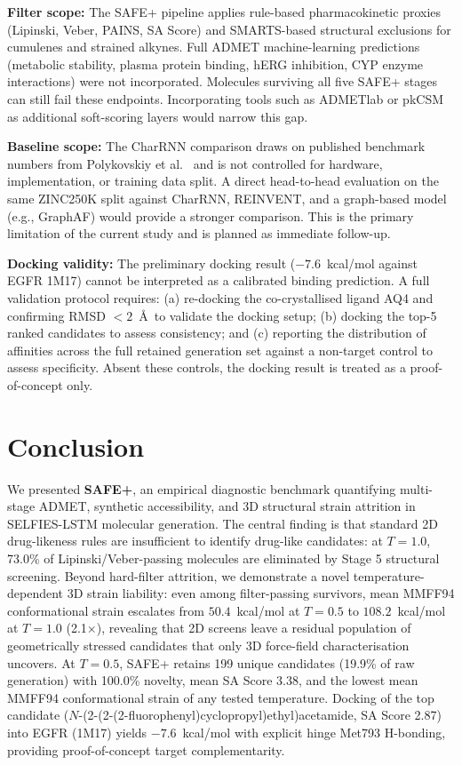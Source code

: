 \documentclass[conference]{IEEEtran}
\begin{document}
\textbf{Filter scope:} The SAFE+ pipeline applies rule-based pharmacokinetic proxies (Lipinski, Veber, PAINS, SA Score) and SMARTS-based structural exclusions for cumulenes and strained alkynes. Full ADMET machine-learning predictions (metabolic stability, plasma protein binding, hERG inhibition, CYP enzyme interactions) were not incorporated. Molecules surviving all five SAFE+ stages can still fail these endpoints. Incorporating tools such as ADMETlab or pkCSM as additional soft-scoring layers would narrow this gap.

\textbf{Baseline scope:} The CharRNN comparison draws on published benchmark numbers from Polykovskiy et al.\ \cite{ref11} and is not controlled for hardware, implementation, or training data split. A direct head-to-head evaluation on the same ZINC250K split against CharRNN, REINVENT, and a graph-based model (e.g., GraphAF) would provide a stronger comparison. This is the primary limitation of the current study and is planned as immediate follow-up.

\textbf{Docking validity:} The preliminary docking result ($-7.6$~kcal/mol against EGFR 1M17) cannot be interpreted as a calibrated binding prediction. A full validation protocol requires: (a) re-docking the co-crystallised ligand AQ4 and confirming RMSD $< 2$~\AA\ to validate the docking setup; (b) docking the top-5 ranked candidates to assess consistency; and (c) reporting the distribution of affinities across the full retained generation set against a non-target control to assess specificity. Absent these controls, the docking result is treated as a proof-of-concept only.


\section{Conclusion}

We presented \textbf{SAFE+}, an empirical diagnostic benchmark quantifying multi-stage ADMET, synthetic accessibility, and 3D structural strain attrition in SELFIES-LSTM molecular generation. The central finding is that standard 2D drug-likeness rules are insufficient to identify drug-like candidates: at $T{=}1.0$, 73.0\% of Lipinski/Veber-passing molecules are eliminated by Stage 5 structural screening. Beyond hard-filter attrition, we demonstrate a novel temperature-dependent 3D strain liability: even among filter-passing survivors, mean MMFF94 conformational strain escalates from $50.4$~kcal/mol at $T{=}0.5$ to $108.2$~kcal/mol at $T{=}1.0$ (2.1$\times$), revealing that 2D screens leave a residual population of geometrically stressed candidates that only 3D force-field characterisation uncovers. At $T{=}0.5$, SAFE+ retains 199 unique candidates (19.9\% of raw generation) with 100.0\% novelty, mean SA Score 3.38, and the lowest mean MMFF94 conformational strain of any tested temperature. Docking of the top candidate ($N$-(2-(2-(2-fluorophenyl)cyclopropyl)ethyl)acetamide, SA Score 2.87) into EGFR (1M17) yields $-7.6$~kcal/mol with explicit hinge Met793 H-bonding, providing proof-of-concept target complementarity.
\end{document}
